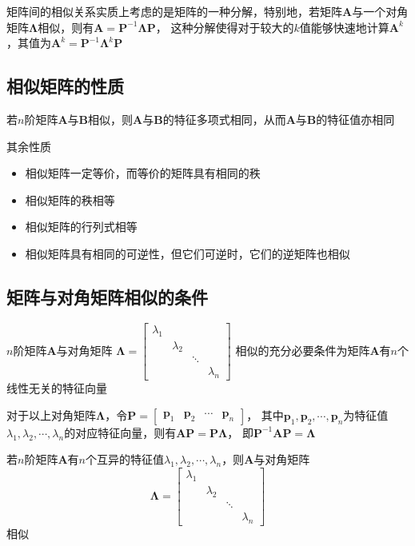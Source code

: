 \documentclass[UTF8]{ctexart}
\newcommand{\ve}[1]{{\bm{#1}}}
\newcommand{\mat}[1]{\ve{#1}}
\newcommand{\emplin}{\vspace{1em}}
\begin{document}
\emplin
\emplin

矩阵间的相似关系实质上考虑的是矩阵的一种分解，特别地，若矩阵$\mat{A}$与一个对角矩阵$\mat{\Lambda}$相似，则有$\mat{A}=\mat{P}^{-1}\mat{\Lambda}\mat{P}$，
这种分解使得对于较大的$k$值能够快速地计算$\mat{A}^k$，其值为$\mat{A}^k=\mat{P}^{-1}\mat{\Lambda}^k\mat{P}$

\subsection*{相似矩阵的性质}
若$n$阶矩阵$\mat{A}$与$\mat{B}$相似，则$\mat{A}$与$\mat{B}$的特征多项式相同，从而$\mat{A}$与$\mat{B}$的特征值亦相同

其余性质
\begin{itemize}
  \item 相似矩阵一定等价，而等价的矩阵具有相同的秩
  \item 相似矩阵的秩相等
  \item 相似矩阵的行列式相等
  \item 相似矩阵具有相同的可逆性，但它们可逆时，它们的逆矩阵也相似
\end{itemize}

\subsection*{矩阵与对角矩阵相似的条件}
$n$阶矩阵$\mat{A}$与对角矩阵
$\mat{\Lambda}=\begin{bmatrix}
\lambda_1\\
&\lambda_2\\
&&\ddots\\
&&&\lambda_n
\end{bmatrix}$
相似的充分必要条件为矩阵$\mat{A}$有$n$个线性无关的特征向量

对于以上对角矩阵$\mat{\Lambda}$，令$\mat{P}=\begin{bmatrix}\mat{p}_1&\mat{p}_2&\cdots&\mat{p}_n\end{bmatrix}$，
其中$\mat{p}_1,\mat{p}_2,\cdots,\mat{p}_n$为特征值$\lambda_1,\lambda_2,\cdots,\lambda_n$的对应特征向量，则有$\mat{A}\mat{P}=\mat{P}\mat{\Lambda}$，
即$\mat{P}^{-1}\mat{A}\mat{P}=\mat{\Lambda}$

\emplin
\emplin

若$n$阶矩阵$\mat{A}$有$n$个互异的特征值$\lambda_1,\lambda_2,\cdots,\lambda_n$，则$\mat{A}$与对角矩阵
\[\mat{\Lambda}=\begin{bmatrix}
\lambda_1\\
&\lambda_2\\
&&\ddots\\
&&&\lambda_n
\end{bmatrix}\]
相似
\end{document}
